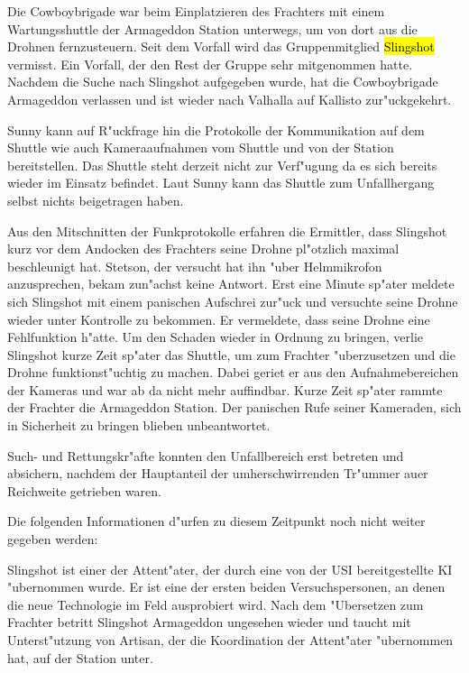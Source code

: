Die Cowboybrigade war beim Einplatzieren des Frachters mit einem Wartungsshuttle der Armageddon Station unterwegs, um von dort aus die Drohnen fernzusteuern. Seit dem Vorfall wird das Gruppenmitglied \hl{Slingshot} vermisst. Ein Vorfall, der den Rest der Gruppe sehr mitgenommen hatte. Nachdem die Suche nach Slingshot aufgegeben wurde, hat die Cowboybrigade Armageddon verlassen und ist wieder nach Valhalla auf Kallisto zur"uckgekehrt.

Sunny kann auf R"uckfrage hin die Protokolle der Kommunikation auf dem Shuttle wie auch Kameraaufnahmen vom Shuttle und von der Station bereitstellen. Das Shuttle steht derzeit nicht zur Verf"ugung da es sich bereits wieder im Einsatz befindet. Laut Sunny kann das Shuttle zum Unfallhergang selbst nichts beigetragen haben.

Aus den Mitschnitten der Funkprotokolle erfahren die Ermittler, dass Slingshot kurz vor dem Andocken des Frachters seine Drohne pl"otzlich maximal beschleunigt hat. Stetson, der versucht hat ihn "uber Helmmikrofon anzusprechen, bekam zun"achst keine Antwort. Erst eine Minute sp"ater meldete sich Slingshot mit einem panischen Aufschrei zur"uck und versuchte seine Drohne wieder unter Kontrolle zu bekommen. Er vermeldete, dass seine Drohne eine Fehlfunktion h"atte. Um den Schaden wieder in Ordnung zu bringen, verlie\3 Slingshot kurze Zeit sp"ater das Shuttle, um zum Frachter "uberzusetzen und die Drohne funktionst"uchtig zu machen. Dabei geriet er aus den Aufnahmebereichen der Kameras und war ab da nicht mehr auffindbar. Kurze Zeit sp"ater rammte der Frachter die Armageddon Station. Der panischen Rufe seiner Kameraden, sich in Sicherheit zu bringen blieben unbeantwortet.

Such- und Rettungskr"afte konnten den Unfallbereich erst betreten und absichern, nachdem der Hauptanteil der umherschwirrenden Tr"ummer au\3er Reichweite getrieben waren.

\begin{remarks}
	Die folgenden Informationen d"urfen zu diesem Zeitpunkt noch nicht weiter gegeben werden:
	
	Slingshot ist einer der Attent"ater, der durch eine von der USI bereitgestellte KI "ubernommen wurde. Er ist eine der ersten beiden Versuchspersonen, an denen die neue Technologie im Feld ausprobiert wird. Nach dem "Ubersetzen zum Frachter betritt Slingshot Armageddon ungesehen wieder und taucht mit Unterst"utzung von Artisan, der die Koordination der Attent"ater "ubernommen hat, auf der Station unter.
\end{remarks}

